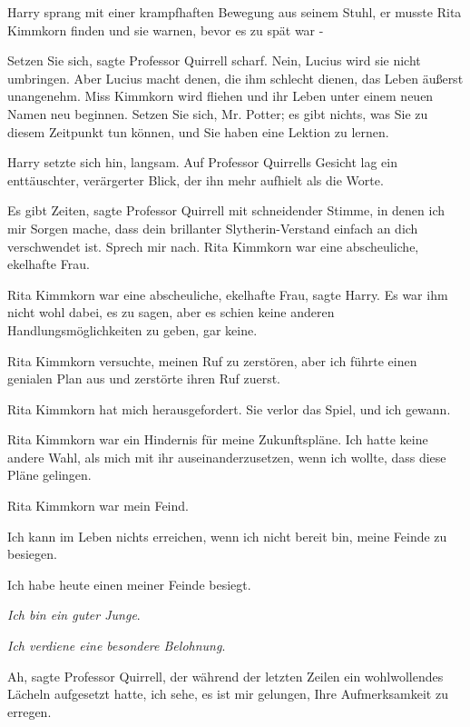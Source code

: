 Harry sprang mit einer krampfhaften Bewegung aus seinem Stuhl, er musste Rita
Kimmkorn finden und sie warnen, bevor es zu spät war -

\glqq{}Setzen Sie sich\grqq{}, sagte Professor Quirrell scharf. \glqq{}Nein,
Lucius wird sie nicht umbringen. Aber Lucius macht denen, die ihm schlecht
dienen, das Leben äußerst unangenehm. Miss Kimmkorn wird fliehen und ihr Leben
unter einem neuen Namen neu beginnen. Setzen Sie sich, Mr. Potter; es gibt
nichts, was Sie zu diesem Zeitpunkt tun können, und Sie haben eine Lektion zu
lernen.\grqq{}

Harry setzte sich hin, langsam. Auf Professor Quirrells Gesicht lag ein
enttäuschter, verärgerter Blick, der ihn mehr aufhielt als die Worte.

\glqq{}Es gibt Zeiten\grqq{}, sagte Professor Quirrell mit schneidender Stimme,
\glqq{}in denen ich mir Sorgen mache, dass dein brillanter Slytherin-Verstand
einfach an dich verschwendet ist. Sprech mir nach. Rita Kimmkorn war eine
abscheuliche, ekelhafte Frau.\grqq{}

\glqq{}Rita Kimmkorn war eine abscheuliche, ekelhafte Frau\grqq{}, sagte Harry.
Es war ihm nicht wohl dabei, es zu sagen, aber es schien keine anderen
Handlungsmöglichkeiten zu geben, gar keine.

\glqq{}Rita Kimmkorn versuchte, meinen Ruf zu zerstören, aber ich führte einen
genialen Plan aus und zerstörte ihren Ruf zuerst.\grqq{}

\glqq{}Rita Kimmkorn hat mich herausgefordert. Sie verlor das Spiel, und ich
gewann.\grqq{}

\glqq{}Rita Kimmkorn war ein Hindernis für meine Zukunftspläne. Ich hatte keine
andere Wahl, als mich mit ihr auseinanderzusetzen, wenn ich wollte, dass diese
Pläne gelingen.\grqq{}

\glqq{}Rita Kimmkorn war mein Feind.\grqq{}

\glqq{}Ich kann im Leben nichts erreichen, wenn ich nicht bereit bin, meine
Feinde zu besiegen.\grqq{}

\glqq{}Ich habe heute einen meiner Feinde besiegt.\grqq{}

\glqq{}\emph{Ich bin ein guter Junge}.\grqq{}

\glqq{}\emph{Ich verdiene eine besondere Belohnung}.\grqq{}

\glqq{}Ah\grqq{}, sagte Professor Quirrell, der während der letzten Zeilen ein
wohlwollendes Lächeln aufgesetzt hatte, \glqq{}ich sehe, es ist mir gelungen,
Ihre Aufmerksamkeit zu erregen.\grqq{}

